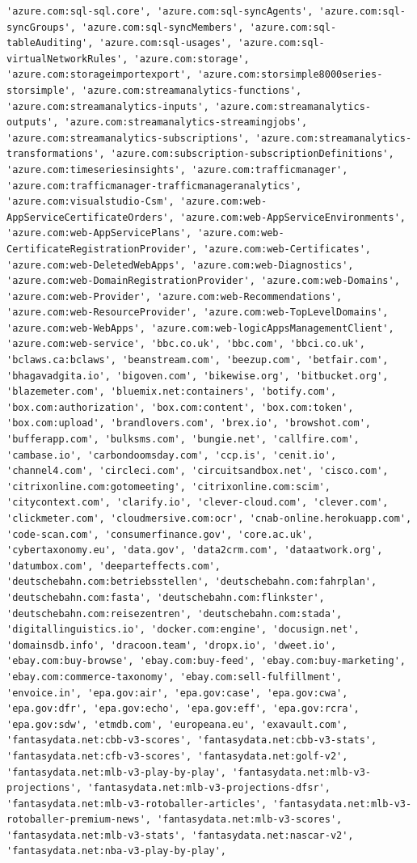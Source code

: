 \documentclass[11pt]{article}
\begin{document}
\begin{Verbatim}[commandchars=\\\{\}]
'azure.com:sql-sql.core', 'azure.com:sql-syncAgents', 'azure.com:sql-syncGroups', 'azure.com:sql-syncMembers', 'azure.com:sql-tableAuditing', 'azure.com:sql-usages', 'azure.com:sql-virtualNetworkRules', 'azure.com:storage', 'azure.com:storageimportexport', 'azure.com:storsimple8000series-storsimple', 'azure.com:streamanalytics-functions', 'azure.com:streamanalytics-inputs', 'azure.com:streamanalytics-outputs', 'azure.com:streamanalytics-streamingjobs', 'azure.com:streamanalytics-subscriptions', 'azure.com:streamanalytics-transformations', 'azure.com:subscription-subscriptionDefinitions', 'azure.com:timeseriesinsights', 'azure.com:trafficmanager', 'azure.com:trafficmanager-trafficmanageranalytics', 'azure.com:visualstudio-Csm', 'azure.com:web-AppServiceCertificateOrders', 'azure.com:web-AppServiceEnvironments', 'azure.com:web-AppServicePlans', 'azure.com:web-CertificateRegistrationProvider', 'azure.com:web-Certificates', 'azure.com:web-DeletedWebApps', 'azure.com:web-Diagnostics', 'azure.com:web-DomainRegistrationProvider', 'azure.com:web-Domains', 'azure.com:web-Provider', 'azure.com:web-Recommendations', 'azure.com:web-ResourceProvider', 'azure.com:web-TopLevelDomains', 'azure.com:web-WebApps', 'azure.com:web-logicAppsManagementClient', 'azure.com:web-service', 'bbc.co.uk', 'bbc.com', 'bbci.co.uk', 'bclaws.ca:bclaws', 'beanstream.com', 'beezup.com', 'betfair.com', 'bhagavadgita.io', 'bigoven.com', 'bikewise.org', 'bitbucket.org', 'blazemeter.com', 'bluemix.net:containers', 'botify.com', 'box.com:authorization', 'box.com:content', 'box.com:token', 'box.com:upload', 'brandlovers.com', 'brex.io', 'browshot.com', 'bufferapp.com', 'bulksms.com', 'bungie.net', 'callfire.com', 'cambase.io', 'carbondoomsday.com', 'ccp.is', 'cenit.io', 'channel4.com', 'circleci.com', 'circuitsandbox.net', 'cisco.com', 'citrixonline.com:gotomeeting', 'citrixonline.com:scim', 'citycontext.com', 'clarify.io', 'clever-cloud.com', 'clever.com', 'clickmeter.com', 'cloudmersive.com:ocr', 'cnab-online.herokuapp.com', 'code-scan.com', 'consumerfinance.gov', 'core.ac.uk', 'cybertaxonomy.eu', 'data.gov', 'data2crm.com', 'dataatwork.org', 'datumbox.com', 'deeparteffects.com', 'deutschebahn.com:betriebsstellen', 'deutschebahn.com:fahrplan', 'deutschebahn.com:fasta', 'deutschebahn.com:flinkster', 'deutschebahn.com:reisezentren', 'deutschebahn.com:stada', 'digitallinguistics.io', 'docker.com:engine', 'docusign.net', 'domainsdb.info', 'dracoon.team', 'dropx.io', 'dweet.io', 'ebay.com:buy-browse', 'ebay.com:buy-feed', 'ebay.com:buy-marketing', 'ebay.com:commerce-taxonomy', 'ebay.com:sell-fulfillment', 'envoice.in', 'epa.gov:air', 'epa.gov:case', 'epa.gov:cwa', 'epa.gov:dfr', 'epa.gov:echo', 'epa.gov:eff', 'epa.gov:rcra', 'epa.gov:sdw', 'etmdb.com', 'europeana.eu', 'exavault.com', 'fantasydata.net:cbb-v3-scores', 'fantasydata.net:cbb-v3-stats', 'fantasydata.net:cfb-v3-scores', 'fantasydata.net:golf-v2', 'fantasydata.net:mlb-v3-play-by-play', 'fantasydata.net:mlb-v3-projections', 'fantasydata.net:mlb-v3-projections-dfsr', 'fantasydata.net:mlb-v3-rotoballer-articles', 'fantasydata.net:mlb-v3-rotoballer-premium-news', 'fantasydata.net:mlb-v3-scores', 'fantasydata.net:mlb-v3-stats', 'fantasydata.net:nascar-v2', 'fantasydata.net:nba-v3-play-by-play', 
\end{Verbatim}
\end{document}
